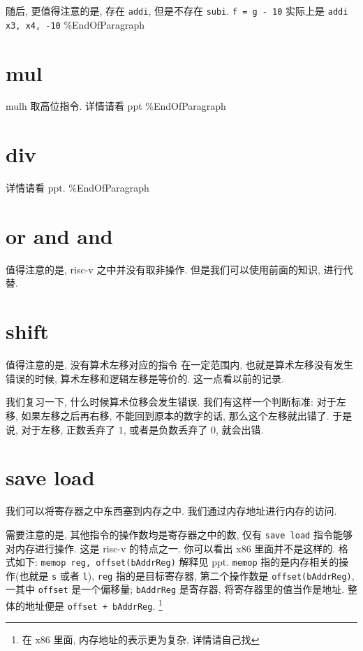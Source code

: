 \documentclass[11pt]{article}
\begin{document}
随后, 更值得注意的是, 存在 \texttt{addi}, 但是不存在 \texttt{subi}. 
\texttt{f = g - 10}
实际上是 \texttt{addi x3, x4, -10}
\%EndOfParagraph

\section{mul}
\label{sec:org9d7329e}
mulh 取高位指令. 详情请看 ppt 
\%EndOfParagraph

\section{div}
\label{sec:orge17f695}
详情请看 ppt. 
\%EndOfParagraph

\section{or and and}
\label{sec:orge78c805}
值得注意的是, risc-v 之中并没有取非操作. 
但是我们可以使用前面的知识, 进行代替. 

\section{shift}
\label{sec:org788e716}

值得注意的是, 没有算术左移对应的指令
在一定范围内, 也就是算术左移没有发生错误的时候, 算术左移和逻辑左移是等价的. 这一点看以前的记录. 

我们复习一下, 什么时候算术位移会发生错误. 我们有这样一个判断标准: 对于左移, 如果左移之后再右移, 不能回到原本的数字的话, 
那么这个左移就出错了. 于是说, 对于左移, 正数丢弃了 \(1\), 或者是负数丢弃了 \(0\), 就会出错.

\section{save load}
\label{sec:org6ac868a}

我们可以将寄存器之中东西塞到内存之中. 我们通过内存地址进行内存的访问. 

需要注意的是, 其他指令的操作数均是寄存器之中的数, 仅有 \texttt{save load} 指令能够对内存进行操作. 
这是 risc-v 的特点之一. 你可以看出 x86 里面并不是这样的. 格式如下: 
\texttt{memop reg, offset(bAddrReg)}
解释见 ppt. \texttt{memop} 指的是内存相关的操作(也就是 \texttt{s} 或者 \texttt{l}), \texttt{reg} 指的是目标寄存器, 第二个操作数是 
\texttt{offset(bAddrReg)}, 一其中 \texttt{offset} 是一个偏移量; \texttt{bAddrReg} 是寄存器, 将寄存器里的值当作是地址. 整体的地址便是 \texttt{offset + bAddrReg}. \footnote{在 x86 里面, 内存地址的表示更为复杂, 详情请自己找}
\end{document}
